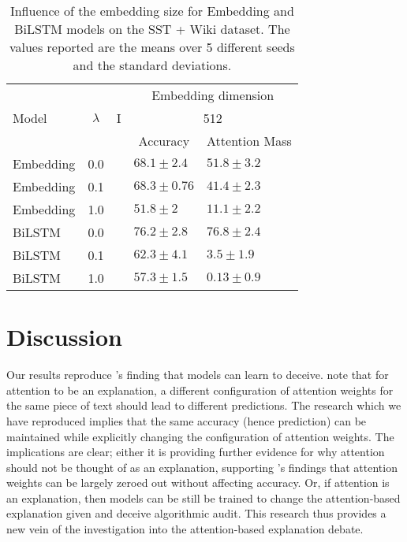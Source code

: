 \begin{table}[H]
\centering
\caption{Influence of the embedding size for Embedding and BiLSTM models on the SST + Wiki dataset. The values reported are the means over 5 different seeds and the standard deviations.}
\label{tab:embedding-results-2}
\begin{tabular}{lccll} 
\toprule
          &           &   & \multicolumn{2}{c}{Embedding dimension}              \\
Model     & $\lambda$ & I & \multicolumn{2}{c}{512}                              \\ 
\cline{4-5}
          &           &   & \multicolumn{1}{c}{Accuracy} & \multicolumn{1}{c}{Attention Mass}  \\ 
\midrule
Embedding & 0.0       &   & $68.1 \pm 2.4$           & $51.8 \pm 3.2$            \\
Embedding & 0.1       &   & $68.3 \pm 0.76$          & $41.4 \pm 2.3$            \\
Embedding & 1.0       &   & $51.8 \pm 2$             & $11.1 \pm 2.2$            \\ 
\midrule
BiLSTM    & 0.0       &   & $76.2 \pm 2.8$           & $76.8 \pm 2.4$            \\
BiLSTM    & 0.1       &   & $62.3 \pm 4.1$           & $3.5 \pm 1.9$             \\
BiLSTM    & 1.0       &   & $57.3 \pm 1.5$           & $0.13 \pm 0.9$            \\
\bottomrule
\end{tabular}
\end{table}

\section{Discussion}

Our results reproduce \citet{pruthi-etal-2020-learning}'s finding that models can learn to deceive.
\cite{jain2019attention} note that for attention to be an explanation, a different configuration of attention weights for the same piece of text should lead to different predictions. The research which we have reproduced implies that the same accuracy (hence prediction) can be maintained while explicitly changing the configuration of attention weights. The implications are clear; either it is providing further evidence for why attention should not be thought of as an explanation, supporting \citet{serrano2019attention}'s findings that attention weights can be largely zeroed out without affecting accuracy. Or, if attention is an explanation, then models can be still be trained to change the attention-based explanation given and deceive algorithmic audit. This research thus provides a new vein of the investigation into the attention-based explanation debate.

